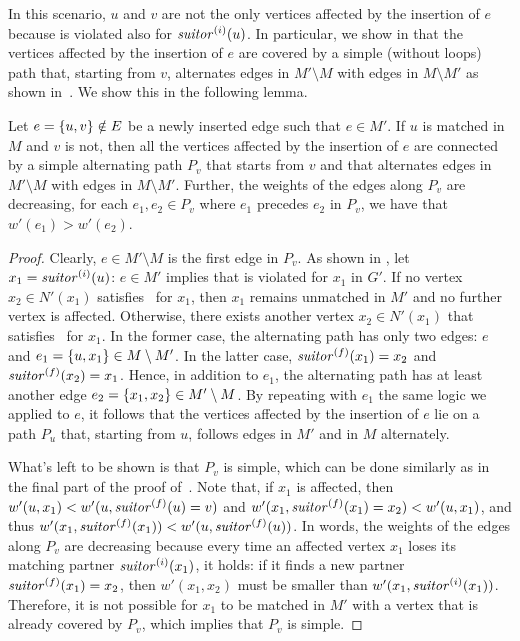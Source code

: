 In this scenario, $u$ and $v$ are not the only vertices affected by the
insertion of $e$ because  is violated also for
$\mathit{suitor}^{(i)}(u)$. In particular, we show in
 that the vertices affected by the
insertion of $e$ are covered by a simple (\ie without loops) path that,
starting from $v$, alternates edges in $M'\setminus M$ with edges in
$M\setminus M'$ as shown in~. We show this
in the following lemma.

\begin{lemma}
\label{lemma:dyn-mwm:alternating-path}
Let $e = \set{u, v} \notin E$ be a newly inserted edge such that $e \in M'$.
If $u$ is matched in $M$ and $v$ is not, then all the vertices affected by the
insertion of $e$ are connected by a simple alternating path $P_v$
that starts from $v$ and that alternates edges in $M'\setminus M$ with edges in
$M\setminus M'$. Further, the weights of the edges along $P_v$ are decreasing,
\ie for each $e_1, e_2\in P_v$ where $e_1$ precedes $e_2$ in $P_v$, we have
that $w'(e_1) > w'(e_2)$.
\end{lemma}

\begin{proof}
Clearly, $e \in M' \setminus M$ is the first edge in $P_v$. As shown in
, let $x_1 = \mathit{suitor}^{(i)}(u)$: $e \in
M'$ implies that  is violated for $x_1$ in $G'$. If no vertex
$x_2\in N'(x_1)$ satisfies~ for $x_1$, then $x_1$ remains
unmatched in $M'$ and no further vertex is affected. Otherwise, there exists
another vertex $x_2\in N'(x_1)$ that satisfies~ for $x_1$. In
the former case, the alternating path has only two edges: $e$ and $e_1 =
\set{u, x_1}\in M\setminus M'$. In the latter case, $\mathit{suitor}^{(f)}(x_1) = x_2$
and $\mathit{suitor}^{(f)}(x_2) = x_1$. Hence, in addition to $e_1$, the alternating
path has at least another edge $e_2 = \set{x_1, x_2}\in M'\setminus M$. By
repeating with $e_1$ the same logic we applied to $e$, it follows that the
vertices affected by the insertion of $e$ lie on a path $P_u$ that, starting
from $u$, follows edges in $M'$ and in $M$ alternately.

What's left to be shown is that $P_v$ is simple, which can be done similarly as
in the final part of the proof of~\cite[Lemma 3.2]{DBLP:conf/ipps/ManneH14}.
Note that, if $x_1$ is affected, then $w'(u, x_1) < w'(u, \mathit{suitor}^{(f)}(u) =
v)$ and $w'(x_1, \mathit{suitor}^{(f)}(x_1) = x_2) < w'(u, x_1)$, and thus $w'(x_1,
\mathit{suitor}^{(f)}(x_1)) < w'(u, \mathit{suitor}^{(f)}(u))$. In words, the weights of the
edges along $P_v$ are decreasing because every time an affected vertex $x_1$
loses its matching partner $\mathit{suitor}^{(i)}(x_1)$, it holds: if it finds a new
partner $\mathit{suitor}^{(f)}(x_1) = x_2$, then $w'(x_1, x_2)$ must be smaller than
$w'(x_1, \mathit{suitor}^{(i)}(x_1))$. Therefore, it is not possible for $x_1$ to be
matched in $M'$ with a vertex that is already covered by $P_v$, which implies
that $P_v$ is simple.
\end{proof}

